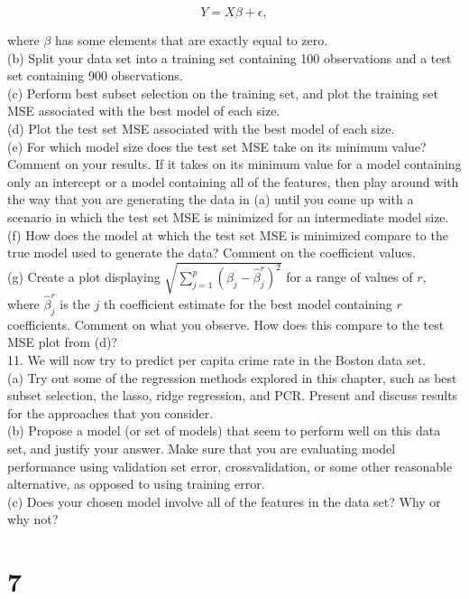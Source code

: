 \documentclass[10pt]{article}
\begin{document}
$$
Y=X \beta+\epsilon,
$$

where $\beta$ has some elements that are exactly equal to zero.\\
(b) Split your data set into a training set containing 100 observations and a test set containing 900 observations.\\
(c) Perform best subset selection on the training set, and plot the training set MSE associated with the best model of each size.\\
(d) Plot the test set MSE associated with the best model of each size.\\
(e) For which model size does the test set MSE take on its minimum value? Comment on your results. If it takes on its minimum value for a model containing only an intercept or a model containing all of the features, then play around with the way that you are generating the data in (a) until you come up with a scenario in which the test set MSE is minimized for an intermediate model size.\\
(f) How does the model at which the test set MSE is minimized compare to the true model used to generate the data? Comment on the coefficient values.\\
(g) Create a plot displaying $\sqrt{\sum_{j=1}^{p}\left(\beta_{j}-\hat{\beta}_{j}^{r}\right)^{2}}$ for a range of values of $r$, where $\hat{\beta}_{j}^{r}$ is the $j$ th coefficient estimate for the best model containing $r$ coefficients. Comment on what you observe. How does this compare to the test MSE plot from (d)?\\
11. We will now try to predict per capita crime rate in the Boston data set.\\
(a) Try out some of the regression methods explored in this chapter, such as best subset selection, the lasso, ridge regression, and PCR. Present and discuss results for the approaches that you consider.\\
(b) Propose a model (or set of models) that seem to perform well on this data set, and justify your answer. Make sure that you are evaluating model performance using validation set error, crossvalidation, or some other reasonable alternative, as opposed to using training error.\\
(c) Does your chosen model involve all of the features in the data set? Why or why not?


\section*{7}
\end{document}

